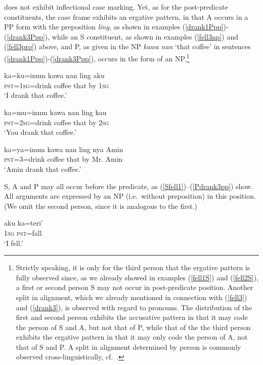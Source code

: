 \documentclass[output=paper
,modfonts
,nonflat]{langsci/langscibook}
\begin{document}
\noindent {} does not exhibit inflectional case marking. Yet, as for the post-predicate constituents, the case frame exhibits an ergative pattern, in that A occurs in a PP form with the preposition \textit{ling}, as shown in examples (\ref{drank1Ppp})-(\ref{drank3Ppp}), while an S constituent, as shown in examples (\ref{fell3np}) and (\ref{fell3pro}) above, and P, as given in the NP \textit{kawa nan} `that coffee' in sentences (\ref{drank1Ppp})-(\ref{drank3Ppp}), occurs in the form of an NP.\footnote{Strictly speaking, it is only for the third person  that the ergative pattern is fully observed since, as we already showed in examples (\ref{fell1S}) and (\ref{fell2S}), a first or second person S may not occur in post-predicate position. Another split in alignment, which we already mentioned in connection with (\ref{fell3}) and (\ref{drank3}), is observed with regard to  pronouns. The distribution of the first and second person  exhibits the accusative pattern in that it may code the person of S and A, but not that of P, while that of the the third person  exhibits the ergative pattern in that it may only code the person of A, not that of S and P. A split in alignment determined by person is commonly observed cross-linguistically, cf.\  \citet{siean13}.}

\ea\label{drank1Ppp}
\gll ka=ku=inum kawa nan ling aku\\
\textsc{pst=1sg}=drink coffee that by \textsc{1sg}\\
\glt `I drank that coffee.'
\z

\ea\label{drank2Ppp}
\gll ka=mu=inum kawa nan ling kau\\
\textsc{pst=2sg}=drink coffee that by \textsc{2sg}\\
\glt `You drank that coffee.’
\z 

\ea\label{drank3Ppp}
\gll ka=ya=inum 	kawa 	nan	ling	nya Amin\\
\textsc{pst}=3=drink	coffee	that	by	Mr. Amin\\
\glt `Amin drank that coffee.’
\z

\noindent S, A and P may all occur before the predicate, as  (\ref{Sfell1})–(\ref{Pdrank3pp}) show. All arguments are expressed by an NP (i.e.\ without preposition) in this position. (We omit the second person, since it is analogous to the first.)

\ea\label{Sfell1}
\gll aku ka=teri'\\
\textsc{1sg} \textsc{pst}=fall\\
\glt `I fell.'
\z
\end{document}
